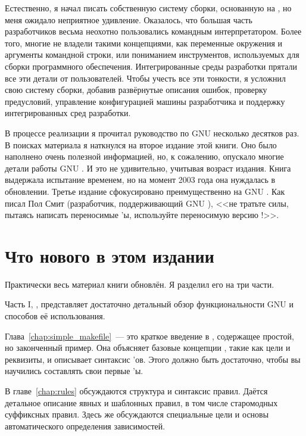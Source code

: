 Естественно, я начал писать собственную систему сборки, основанную на
\GNUmake{}, но меня ожидало неприятное удивление. Оказалось, что
большая часть разработчиков весьма неохотно пользовались командным
интерпретатором. Более того, многие не владели такими концепциями, как
переменные окружения и аргументы командной строки, или пониманием
инструментов, используемых для сборки программного обеспечения.
Интегрированные среды разработки прятали все эти детали от
пользователей. Чтобы учесть все эти тонкости, я усложнил свою систему
сборки, добавив развёрнутые описания ошибок, проверку предусловий,
управление конфигурацией машины разработчика и поддержку
интегрированных сред разработки.

В процессе реализации я прочитал руководство по GNU \GNUmake{}
несколько десятков раз. В поисках материала я наткнулся на второе
издание этой книги. Оно было наполнено очень полезной информацией, но,
к сожалению, опускало многие детали работы GNU \GNUmake{}. И это не
удивительно, учитывая возраст издания. Книга выдержала испытание
временем, но на момент 2003 года она нуждалась в обновлении. Третье
издание сфокусировано преимущественно на GNU \GNUmake{}. Как писал
Пол Смит (разработчик, поддерживающий GNU \GNUmake{}), <<не тратьте
силы, пытаясь написать переносимые \Makefile{}'ы, используйте
переносимую версию \GNUmake{}!>>.

\section*{Что нового в этом издании}
Практически весь материал книги обновлён. Я разделил его на три части.

Часть I, \textit{}, представляет достаточно
детальный обзор функциональности GNU \GNUmake{} и способов её
использования.

Глава~\ref{chap:simple_makefile}~--- это краткое введение в
\GNUmake{}, содержащее простой, но законченный пример. Она объясняет
базовые концепции \GNUmake{}, такие как цели и реквизиты, и описывает
синтаксис \Makefile{}'ов. Этого должно быть достаточно, чтобы вы
научились составлять свои первые \Makefile{}'ы.

В главе~\ref{chap:rules} обсуждаются структура и синтаксис правил.
Даётся детальное описание явных и шаблонных правил, в том числе
старомодных суффиксных правил. Здесь же обсуждаются специальные цели и
основы автоматического определения зависимостей.

